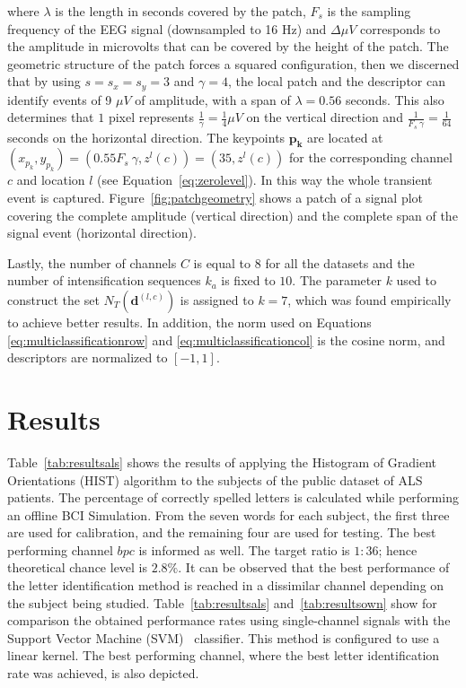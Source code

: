 \noindent where $ \lambda $ is the length in seconds covered by the patch, $ F_s $ is the sampling frequency of the EEG signal (downsampled to 16 Hz) and  $\Delta  \mu V $ corresponds to the amplitude in microvolts that can be covered by the height of the patch. The geometric structure of the patch forces a squared configuration, then we discerned that by using $ s =s_x =s_y = 3 $ and $ \gamma = 4 $,  the local patch and the descriptor can identify events of 9 $ \mu V $ of amplitude, with a span of $ \lambda = 0.56$ seconds.  This also determines that $ 1 $ pixel represents $ \frac{1}{\gamma}= \frac{1}{4} \mu V $ on the vertical direction and $\frac{1}{F_s \ \gamma}=\frac{1}{64}$ seconds on the horizontal direction. The keypoints  $\mathbf{p_k}$  are located at $ (x_{p_k}, y_{p_k} )= ( 0.55 F_s \ \gamma, z^l(c) )= (35,  z^l(c)) $ for the corresponding channel $c$ and location $l$ (see Equation~\ref{eq:zerolevel}).   In this way the whole transient event is captured. 
Figure~\ref{fig:patchgeometry} shows a patch of a signal plot covering the complete amplitude (vertical direction) and the complete span of the signal event (horizontal direction). 

Lastly, the number of channels $C$ is equal to $8$ for all the datasets and the number of intensification sequences $k_a$ is fixed to $10$.  The parameter $k$ used to construct the set $N_T(\mathbf{d}^{(l,c)})$ is assigned to $k=7$, which was found empirically to achieve better results.  In addition, the norm used on  Equations \ref{eq:multiclassificationrow} and \ref{eq:multiclassificationcol} is the cosine norm, and descriptors are normalized to $ \left[ -1, 1 \right] $.

\section{Results}

Table~\ref{tab:resultsals} shows the results of applying the Histogram of Gradient Orientations (HIST) algorithm to the subjects of the public dataset of ALS patients. The percentage of correctly spelled letters is calculated while performing an offline BCI Simulation.  From the seven words for each subject, the first three are used for calibration, and the remaining four are used for testing.  The best performing channel  $bpc$ is informed as well. The target ratio is $1:36$; hence theoretical chance level is $2.8\%$. It can be observed that the best performance of the letter identification method is reached in a dissimilar channel depending on the subject being studied.  Table~\ref{tab:resultsals} and~\ref{tab:resultsown} show for comparison the obtained performance rates using single-channel signals with the Support Vector Machine (SVM)~\cite{Scholkopf2001} classifier.  This method is configured to use a linear kernel.  The best performing channel, where the best letter identification rate was achieved, is also depicted.


